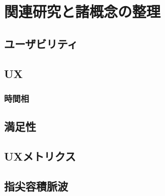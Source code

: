 \chapter{関連研究と諸概念の整理}
\label{chap:prevresearch}

\section{ユーザビリティ}

\section{UX}

\subsection{時間相}

\section{満足性}

\section{UXメトリクス}

\section{指尖容積脈波}
